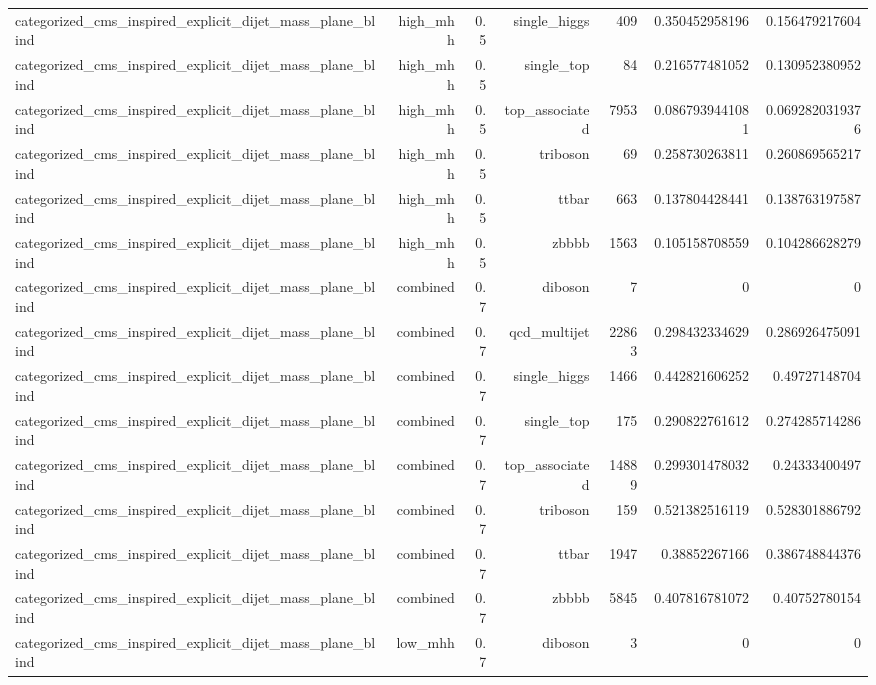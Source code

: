 \begin{table}[htbp]
{\begin{tabular}{lrrrrrr}
categorized\_cms\_inspired\_explicit\_dijet\_mass\_plane\_blind & high\_mhh & 0.5 & single\_higgs & 409 & 0.350452958196 & 0.156479217604 \\
categorized\_cms\_inspired\_explicit\_dijet\_mass\_plane\_blind & high\_mhh & 0.5 & single\_top & 84 & 0.216577481052 & 0.130952380952 \\
categorized\_cms\_inspired\_explicit\_dijet\_mass\_plane\_blind & high\_mhh & 0.5 & top\_associated & 7953 & 0.0867939441081 & 0.0692820319376 \\
categorized\_cms\_inspired\_explicit\_dijet\_mass\_plane\_blind & high\_mhh & 0.5 & triboson & 69 & 0.258730263811 & 0.260869565217 \\
categorized\_cms\_inspired\_explicit\_dijet\_mass\_plane\_blind & high\_mhh & 0.5 & ttbar & 663 & 0.137804428441 & 0.138763197587 \\
categorized\_cms\_inspired\_explicit\_dijet\_mass\_plane\_blind & high\_mhh & 0.5 & zbbbb & 1563 & 0.105158708559 & 0.104286628279 \\
categorized\_cms\_inspired\_explicit\_dijet\_mass\_plane\_blind & combined & 0.7 & diboson & 7 & 0 & 0 \\
categorized\_cms\_inspired\_explicit\_dijet\_mass\_plane\_blind & combined & 0.7 & qcd\_multijet & 22863 & 0.298432334629 & 0.286926475091 \\
categorized\_cms\_inspired\_explicit\_dijet\_mass\_plane\_blind & combined & 0.7 & single\_higgs & 1466 & 0.442821606252 & 0.49727148704 \\
categorized\_cms\_inspired\_explicit\_dijet\_mass\_plane\_blind & combined & 0.7 & single\_top & 175 & 0.290822761612 & 0.274285714286 \\
categorized\_cms\_inspired\_explicit\_dijet\_mass\_plane\_blind & combined & 0.7 & top\_associated & 14889 & 0.299301478032 & 0.24333400497 \\
categorized\_cms\_inspired\_explicit\_dijet\_mass\_plane\_blind & combined & 0.7 & triboson & 159 & 0.521382516119 & 0.528301886792 \\
categorized\_cms\_inspired\_explicit\_dijet\_mass\_plane\_blind & combined & 0.7 & ttbar & 1947 & 0.38852267166 & 0.386748844376 \\
categorized\_cms\_inspired\_explicit\_dijet\_mass\_plane\_blind & combined & 0.7 & zbbbb & 5845 & 0.407816781072 & 0.40752780154 \\
categorized\_cms\_inspired\_explicit\_dijet\_mass\_plane\_blind & low\_mhh & 0.7 & diboson & 3 & 0 & 0 \\

\end{tabular}}
\end{table}

